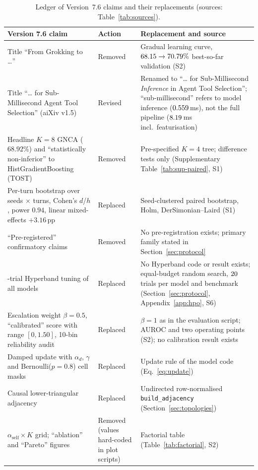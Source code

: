 \documentclass[10pt,twocolumn,letterpaper]{article}
\begin{document}
\begin{table}[p]
\centering
\scriptsize
\setlength{\tabcolsep}{3pt}
\caption{Ledger of Version~7.6 claims and their replacements (sources: Table~\ref{tab:sources}).}\label{tab:ledger}
\begin{tabularx}{\textwidth}{@{}>{\raggedright\arraybackslash}p{5.6cm}>{\raggedright\arraybackslash}p{2.2cm}>{\raggedright\arraybackslash}X@{}}
\toprule
Version 7.6 claim & Action & Replacement and source \\
\midrule
Title ``From Grokking to \ldots'' & Removed & Gradual learning curve, $68.15\to70.79\%$ best-so-far validation (S2) \\
Title ``\ldots{} for Sub-Millisecond Agent Tool Selection'' (aiXiv v1.5) & Revised & Renamed to ``\ldots{} for Sub-Millisecond \emph{Inference} in Agent Tool Selection''; ``sub-millisecond'' refers to model inference ($0.559$\,ms), not the full pipeline ($8.19$\,ms incl.\ featurisation) \\
Headline $K{=}8$ GNCA ($68.92\%$) and ``statistically non-inferior'' to HistGradientBoosting (TOST) & Removed & Pre-specified $K{=}4$ tree; difference tests only (Supplementary Table~\ref{tab:sup-paired}, S1) \\
Per-turn bootstrap over seeds $\times$ turns, Cohen's $d$/$h$, power $0.94$, linear mixed-effects $+3.16$\,pp & Replaced & Seed-clustered paired bootstrap, Holm, DerSimonian--Laird (S1) \\
``Pre-registered'' confirmatory claims & Removed & No pre-registration exists; primary family stated in Section~\ref{sec:protocol} \\
50-trial Hyperband tuning of all models & Replaced & No Hyperband code or result exists; equal-budget random search, $20$ trials per model and benchmark (Section~\ref{sec:protocol}, Appendix~\ref{app:hpo}, S6) \\
Escalation weight $\beta{=}0.5$, ``calibrated'' score with range $[0,1.50]$, 10-bin reliability audit & Replaced & $\beta{=}1$ as in the evaluation script; AUROC and two operating points (S2); no calibration result exists \\
Damped update with $\alpha_d$, $\gamma$ and Bernoulli($p{=}0.8$) cell masks & Replaced & Update rule of the model code (Eq.~\eqref{eq:update}) \\
Causal lower-triangular adjacency & Replaced & Undirected row-normalised \texttt{build\_adjacency} (Section~\ref{sec:topologies}) \\
$\alpha_{\text{self}}\times K$ grid; ``ablation'' and ``Pareto'' figures & Removed (values hard-coded in plot scripts) & Factorial table (Table~\ref{tab:factorial}, S2) \\

\end{tabularx}
\end{table}
\end{document}
